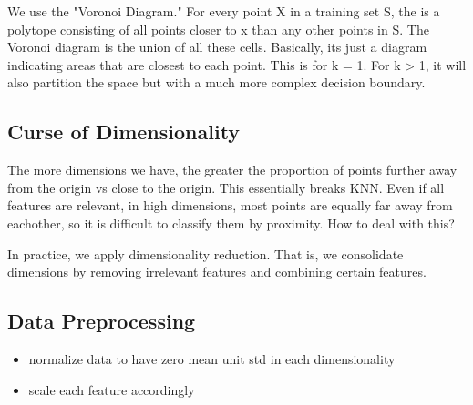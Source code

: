 We use the "Voronoi Diagram." For every point X in a training set S, the  is a polytope consisting of all points closer to x than any other points in S. The Voronoi diagram is the union of all these cells. Basically, its just a diagram indicating areas that are closest to each point. This is for k = 1. For k > 1, it will also partition the space but with a much more complex decision boundary.

\subsection*{Curse of Dimensionality}
The more dimensions we have, the greater the proportion of points further away from the origin vs close to the origin. This essentially breaks KNN. Even if all features are relevant, in high dimensions, most points are equally far away from eachother, so it is difficult to classify them by proximity. How to deal with this?

In practice, we apply dimensionality reduction. That is, we consolidate dimensions by removing irrelevant features and combining certain features. 

\subsection*{Data Preprocessing}
\begin{itemize}
    \item normalize data to have zero mean unit std in each dimensionality
    \item scale each feature accordingly
\end{itemize}